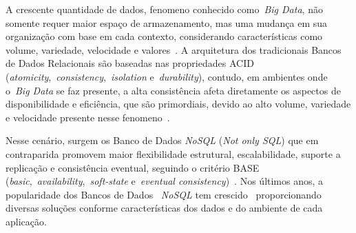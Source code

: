 \documentclass[12pt]{article}
\begin{document}

A crescente quantidade de dados, fenomeno conhecido como~\emph{Big Data}, não somente requer maior espaço de armazenamento, mas uma mudança em sua organização com base em cada contexto, considerando características como volume, variedade, velocidade e valores~\cite{ward2013undefined}. A arquitetura dos tradicionais Bancos de Dados Relacionais são baseadas nas propriedades ACID (\textit{atomicity},~\textit{consistency},~\textit{isolation} e~\textit{durability}), contudo, em ambientes onde o~\emph{Big Data} se faz presente, a alta consistência afeta diretamente os aspectos de disponibilidade e eficiência, que são primordiais, devido ao alto volume, variedade e velocidade presente nesse fenomeno~\cite{aparicio:2016}. 


Nesse cenário, surgem os Banco de Dados \textit{NoSQL} (\emph{Not only SQL}) que em contraparida promovem maior flexibilidade estrutural, escalabilidade, suporte a replicação e consistência eventual, seguindo o critério BASE (\textit{basic},~\textit{availability},~\textit{soft-state} e~\textit{eventual consistency})~\cite{han2011survey}. Nos últimos anos, a popularidade dos Bancos de Dados ~\textit{NoSQL} tem crescido~\cite{cooper2010benchmarking,edlich2015nosql} proporcionando diversas soluções conforme características dos dados e do ambiente de cada aplicação.
\end{document}
